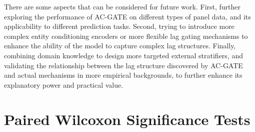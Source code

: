 \documentclass[conference]{IEEEtran}
\begin{document}
There are some aspects that can be considered for future work. First, further exploring the performance of AC-GATE on different types of panel data, and its applicability to different prediction tasks. Second, trying to introduce more complex entity conditioning encoders or more flexible lag gating mechanisms to enhance the ability of the model to capture complex lag structures. Finally, combining domain knowledge to design more targeted external stratifiers, and validating the relationship between the lag structure discovered by AC-GATE and actual mechanisms in more empirical backgrounds, to further enhance its explanatory power and practical value.



\appendices

\section{Paired Wilcoxon Significance Tests}\label{app:wilcoxon}
\end{document}
